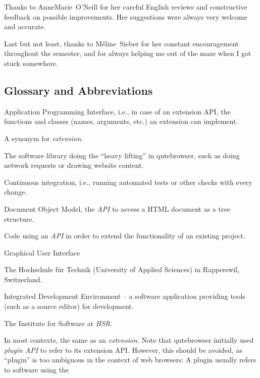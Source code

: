 \documentclass[a4paper,parskip=full,DIV=14,BCOR=15mm]{scrreprt}
\begin{document}
Thanks to AnneMarie~O'Neill for her careful English reviews and constructive
feedback on possible improvements. Her suggestions were always very welcome and
accurate.

Last but not least, thanks to Méline~Sieber for her constant encouragement
throughout the semester, and for always helping me out of the maze when I got
stuck somewhere.



\begin{appendices}
\chapter{Glossary and Abbreviations}
\begin{multicols}{2}
\label{ch:glossary}
\begin{description}[leftmargin=0pt]
  \item[API]{Application Programming Interface, i.e., in
      case of an extension API, the functions and classes (names, arguments,
      etc.) an extension can implement.}
  \item[add-on]{A synonym for \emph{extension}.}
  \item[backend]{The software library doing the ``heavy lifting'' in
      qutebrowser, such as doing network requests or drawing website content.}
  \item[CI]{Continuous integration, i.e., running automated tests or other
      checks with every change.}
  \item[DOM]{Document Object Model, the \emph{API} to access a HTML document as
      a tree structure.}
  \item[extension]{Code using an \emph{API} in order to extend the functionality
      of an existing project.}
  \item[GUI]{Graphical User Interface}
  \item[HSR]{The Hochschule für Technik (University of Applied Sciences) in
      Rapperswil, Switzerland.}
  \item[IDE]{Integrated Development Environment -- a software application
      providing tools (such as a source editor) for development.}
  \item[IFS]{The Institute for Software at \emph{HSR}.}
  \item[plugin]{In most contexts, the same as an \emph{extension}. Note that
      qutebrowser initially used \emph{plugin API} to refer to its extension
      API. However, this should be avoided, as ``plugin'' is too ambiguous in
      the context of web browsers: A plugin usually refers to software using the
}
\end{description}
\end{multicols}
\end{appendices}
\end{document}
